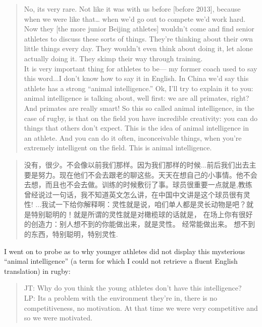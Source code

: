 \begin{CJK}{UTF8}{gbsn}
      \begin{quote}
        No, its very rare.  Not like it was with us before [before 2013], because when we were like that… when we'd go out to compete we'd work hard.  Now they [the more junior Beijing athletes] wouldn't come and find senior athletes to discuss these sorts of things.  They're thinking about their own little things every day.  They wouldn’t even think about doing it, let alone actually doing it.  They skimp their way through training.  \\

        It is very important thing for athletes to be--- my former coach used to say this word...I don't know how to say it in English.  In China we'd say this athlete has a strong ``animal intelligence.'' Ok, I'll try to explain it to you: animal intelligence is talking about, well first: we are all primates, right?  And primates are really smart!  So this so called animal intelligence, in the case of rugby, is that on the field you have incredible creativity: you can do things that others don't expect.  This is the idea of animal intelligence in an athlete.  And you can do it often, inconceivable things, when you're extremely intelligent on the field. This is animal intelligence.
      \end{quote}

      \begin{quote}
        没有，很少。不会像以前我们那样。因为我们那样的时候...前后我们出去主要是努力。现在他们不会去跟老的聊这些。天天在想自己的小事情。他不会去想，而且也不会去做。训练的时候敷衍了事。球员很重要一点就是,教练曾经说过一句话，我不知道英文怎么讲，在中国中文讲是这个球员很有灵性! ...我试一下给你解释啊：灵性就是说，咱们单人都是灵长动物是吧？就是特别聪明的！就是所谓的灵性就是对橄榄球的话就是， 在场上你有很好的创造力：别人想不到的你能做出来，就是灵性。 经常能做出来。 想不到的东西，特别聪明，特别灵性.
      \end{quote}

I went on to probe as to why younger athletes did not display this mysterious ``animal intelligence'' (a term for which I could not retrieve a fluent English translation) in rugby:

\begin{quote}
      JT: Why do you think the young athletes don't have this intelligence? \\
      LP: Its a problem with the environment they're in, there is no competitiveness, no motivation.  At that time we were very competitive and so we were motivated.
\end{quote}


\end{CJK}
